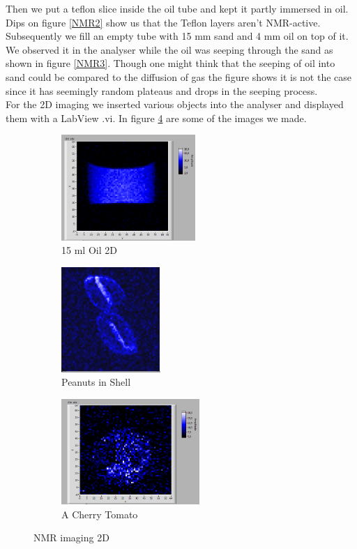 Then we put a teflon slice inside the oil tube and kept it partly immersed in oil. Dips on figure \ref{NMR2} show us that the Teflon layers aren't NMR-active.\\
Subsequently we fill an empty tube with 15 mm sand and 4 mm oil on top of it. We observed it in the analyser while the oil was seeping through the sand as shown in figure \ref{NMR3}. Though one might think that the seeping of oil into sand could be compared to the diffusion of gas the figure shows it is not the case since it has seemingly random plateaus and drops in the seeping process. \\
For the 2D imaging we inserted various objects into the analyser and displayed them with a LabView .vi. In figure \ref{2DNMR} are some of the images we made. \\
\begin{figure}[h]
	\begin{subfigure}{0.32\textwidth}
	\includegraphics[width=0.9\linewidth ,height=4cm]{2d_image/Oil_Vertical_15_2.png}
	\caption{15 ml Oil 2D}
	\label{2DNMR1}
	\end{subfigure}
	\begin{subfigure}{0.32\textwidth}
	\includegraphics[width=0.9\linewidth ,height=4cm]{2d_image/peanut_5avg_2_3d.png}
	\caption{Peanuts in Shell}
	\label{2DNMR2}
	\end{subfigure}
	\begin{subfigure}{0.32\textwidth}
	\includegraphics[width=0.9\linewidth, height=4cm]{2d_image/tomato_2.png}
	\caption{A Cherry Tomato}
	\label{2DNMR3}
	\end{subfigure}
	\caption{NMR imaging 2D}
	\label{2DNMR}
\end{figure} \\
